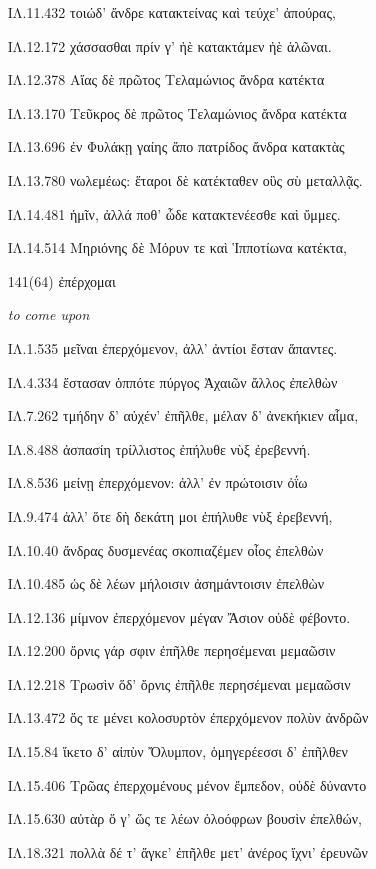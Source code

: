 \begin{enumerate}
{ΙΛ.11.432 τοιώδ' ἄνδρε κατακτείνας καὶ τεύχε' ἀπούρας,

ΙΛ.12.172 χάσσασθαι πρίν γ' ἠὲ κατακτάμεν ἠὲ ἁλῶναι.

ΙΛ.12.378 Αἴας δὲ πρῶτος Τελαμώνιος ἄνδρα κατέκτα

ΙΛ.13.170 Τεῦκρος δὲ πρῶτος Τελαμώνιος ἄνδρα κατέκτα

ΙΛ.13.696 ἐν Φυλάκῃ γαίης ἄπο πατρίδος ἄνδρα κατακτὰς

ΙΛ.13.780 νωλεμέως: ἕταροι δὲ κατέκταθεν οὓς σὺ μεταλλᾷς.

ΙΛ.14.481 ἡμῖν, ἀλλά ποθ' ὧδε κατακτενέεσθε καὶ ὔμμες.

ΙΛ.14.514 Μηριόνης δὲ Μόρυν τε καὶ Ἱπποτίωνα κατέκτα,

}

\clearpage
\item[\large 141(64)]{\large \g ἐπέρχομαι	}

\hspace{0.2cm} \textit{ to come upon }

{\g
ΙΛ.1.535 μεῖναι ἐπερχόμενον, ἀλλ' ἀντίοι ἔσταν ἅπαντες.

ΙΛ.4.334 ἕστασαν ὁππότε πύργος Ἀχαιῶν ἄλλος ἐπελθὼν

ΙΛ.7.262 τμήδην δ' αὐχέν' ἐπῆλθε, μέλαν δ' ἀνεκήκιεν αἷμα,

ΙΛ.8.488 ἀσπασίη τρίλλιστος ἐπήλυθε νὺξ ἐρεβεννή.

ΙΛ.8.536 μείνῃ ἐπερχόμενον: ἀλλ' ἐν πρώτοισιν ὀΐω

ΙΛ.9.474 ἀλλ' ὅτε δὴ δεκάτη μοι ἐπήλυθε νὺξ ἐρεβεννή,

ΙΛ.10.40 ἄνδρας δυσμενέας σκοπιαζέμεν οἶος ἐπελθὼν

ΙΛ.10.485 ὡς δὲ λέων μήλοισιν ἀσημάντοισιν ἐπελθὼν

ΙΛ.12.136 μίμνον ἐπερχόμενον μέγαν Ἄσιον οὐδὲ φέβοντο.

ΙΛ.12.200 ὄρνις γάρ σφιν ἐπῆλθε περησέμεναι μεμαῶσιν

ΙΛ.12.218 Τρωσὶν ὅδ' ὄρνις ἐπῆλθε περησέμεναι μεμαῶσιν

ΙΛ.13.472 ὅς τε μένει κολοσυρτὸν ἐπερχόμενον πολὺν ἀνδρῶν

ΙΛ.15.84 ἵκετο δ' αἰπὺν Ὄλυμπον, ὁμηγερέεσσι δ' ἐπῆλθεν

ΙΛ.15.406 Τρῶας ἐπερχομένους μένον ἔμπεδον, οὐδὲ δύναντο

ΙΛ.15.630 αὐτὰρ ὅ γ' ὥς τε λέων ὀλοόφρων βουσὶν ἐπελθών,

ΙΛ.18.321 πολλὰ δέ τ' ἄγκε' ἐπῆλθε μετ' ἀνέρος ἴχνι' ἐρευνῶν

}
\end{enumerate}
